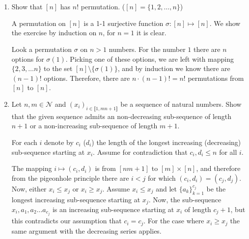 \documentclass[a4paper,11pt]{exam}
\newcommand{\N}{\mathcal N}
\begin{document}
	
	~
	\begin{questions}
		
		\setcounter{question}{-1}
		\question %
		~\vspace{-0.6cm}
		\begin{enumerate}
			\item Show that $ [n] $ has $ n! $ permutation. ($[n] = \{1,2,\ldots,n\}$)
			
			\begin{solution}
				A permutation on $[n]$ is a 1-1 surjective function $\sigma :[n]\mapsto[n]$.
				We show the exercise by induction on $n$, for $n=1$  it is clear.
				
				Look a permutation $\sigma$ on $n>1$ numbers. For the number $1$ there are $n$ options for $\sigma(1)$. Picking one of these options, we are left with mapping $\{2,3,\ldots n\}$ to the set $[n]\setminus\{\sigma(1)\}$, and by induction we know there are $(n-1)!$ options. Therefore, there are $n\cdot (n-1)!= n!$ permutations from $[n]$ to $[n]$.
			\end{solution}
			
			\item Let $ n,m \in \N$ and $(x_i)_{i \in \llbracket 1,mn+1
				\rrbracket}$ be a sequence of natural numbers. Show that the given sequence admits an non-decreasing sub-sequence of length $n+1$ or a non-increasing sub-sequence of length $m+1$.  
			
			\begin{solution}
				For each $i$ denote by $c_i$ ($d_i$) the length of the longest increasing (decreasing) sub-sequence starting at $ x_i $. Assume for contradiction that $ c_i, d_i \leq n $ for all $i$. 
				
				The mapping $i\mapsto (c_i,d_i)$ is from $ [nm+1] $ to $ [m]\times [n] $, and therefore from the pigeonhole principle there are $ i<j $ for which $(c_i,d_i) = (c_j,d_j)$.  Now, either $ x_i \leq x_j $ or $ x_i \geq x_j $. Assume $ x_i\leq x_j $ and let $ \{a_k\}_{k=1}^{c_j} $ be the longest increasing sub-sequence starting at $ x_j $. Now, the sub-sequence $ x_i,a_1,a_2\ldots a_{c_j} $ is an increasing sub-sequence starting at $ x_i $ of length $c_j+1$, but this contradicts our assumption that $c_i = c_j$. 
				For the case where  $ x_i\geq x_j $ the same argument with the decreasing series applies.
				
			\end{solution} 
		\end{enumerate}
		

\end{questions}
\end{document}
